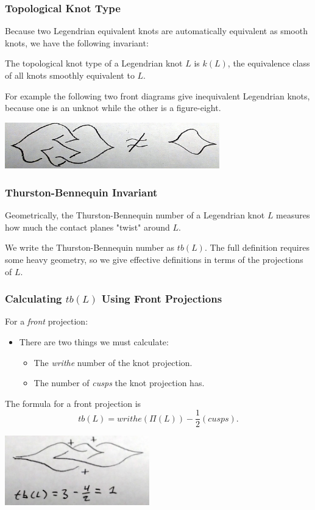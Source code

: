 \documentclass{beamer}
\begin{document}
\begin{frame}
    \frametitle{Topological Knot Type}
    Because two Legendrian equivalent knots are automatically equivalent
    as smooth knots, we have the following invariant:
    \begin{definition}
        The \alert{topological knot type} of a Legendrian knot $L$ is $k(L)$,
        the equivalence class of all knots smoothly equivalent to $L$.
    \end{definition}
    For example the following two front diagrams give inequivalent Legendrian knots,
    because one is an unknot while the other is a figure-eight.

    \includegraphics[height=2cm]{notEq.jpg}
\end{frame}

\begin{frame}
    \frametitle{Thurston-Bennequin Invariant}
    Geometrically, the \alert{Thurston-Bennequin number} of a Legendrian knot $L$
    measures how much the contact planes "twist" around $L$.

    We write the Thurston-Bennequin number as \alert{$tb(L)$}.
    The full definition requires some heavy geometry, so we give
    effective definitions in terms of the projections of $L$.
\end{frame}

\begin{frame}
    \frametitle{Calculating $tb(L)$ Using Front Projections}
    For a \textit{front} projection:
    \begin{itemize}
        \item There are two things we must calculate:
        \begin{itemize}
            \item The \textit{writhe} number of the knot projection.
            \item The number of \textit{cusps} the knot projection has.
        \end{itemize}
    \end{itemize}
    The formula for a front projection is
    \[tb(L) = writhe(\Pi(L)) - \frac{1}{2}(cusps).\]
    \begin{center}
    \includegraphics[height=3cm]{tbFront.jpg}
    \end{center}
\end{frame}
\end{document}
